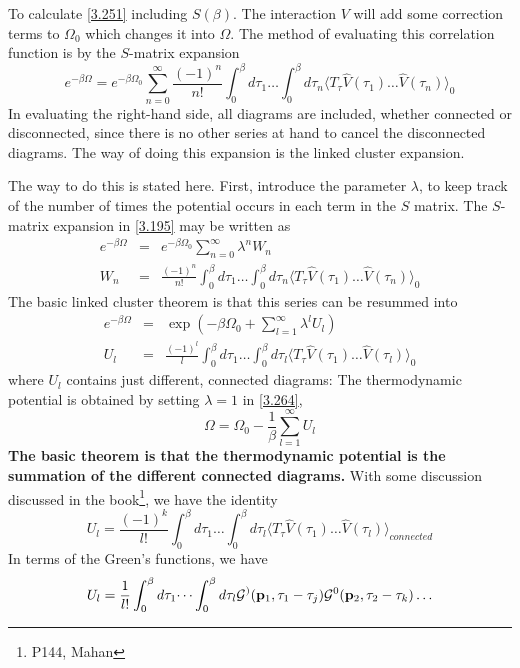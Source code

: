 To calculate \eqref{3.251} including $S(\beta)$.
The interaction $V$ will add some correction terms to $\Omega_0$ which changes it into $\Omega$.
The method of evaluating this correlation function is by the $S$-matrix expansion
\begin{equation}
    e^{-\beta \Omega} = e^{-\beta \Omega_0} \sum_{n=0}^\infty \frac{(-1)^n}{n!} \int_0^\beta d\tau_1 \dots \int_0^\beta d\tau_n \langle T_\tau \hat{V}(\tau_1) \dots \hat{V}(\tau_n) \rangle_0  \label{3.195}
\end{equation}
In evaluating the right-hand side, all diagrams are included, whether connected or disconnected, since there is no other series at hand to cancel the disconnected diagrams.
The way of doing this expansion is the linked cluster expansion.

The way to do this is stated here.
First, introduce the parameter $\lambda$, to keep track of the number of times the potential occurs in each term in the $S$ matrix.
The $S$-matrix expansion in \eqref{3.195} may be written as
\begin{eqnarray}
    e^{-\beta \Omega} &=& e^{-\beta \Omega_0} \sum_{n=0}^\infty \lambda^n W_n   \label{3.262} \\
    W_n &=& \frac{(-1)^n}{n!} \int_0^\beta d\tau_1 \dots \int_0^\beta d\tau_n \langle T_\tau \hat{V}(\tau_1) \dots \hat{V}(\tau_n) \rangle_0    \label{3.263}
\end{eqnarray}
The basic linked cluster theorem is that this series can be resummed into
\begin{eqnarray}
    e^{-\beta \Omega} &=& \exp \left( -\beta \Omega_0 + \sum_{l=1}^\infty \lambda^l U_l \right) \label{3.264} \\
    U_l &=& \frac{(-1)^l}{l} \int_0^\beta d\tau_1 \dots \int_0^\beta d\tau_l \langle T_\tau \hat{V}(\tau_1) \dots \hat{V}(\tau_l) \rangle_0 \label{3.265}
\end{eqnarray}
where $U_l$ contains just different, connected diagrams: The thermodynamic potential is obtained by setting $\lambda=1$ in \eqref{3.264},
\begin{equation}
    \Omega = \Omega_0 - \frac{1}{\beta} \sum_{l=1}^\infty U_l  \label{3.266}
\end{equation}
\textbf{The basic theorem is that the thermodynamic potential is the summation of the different connected diagrams.}
With some discussion discussed in the book\footnote{P144, Mahan}, we have the identity
\begin{equation}
    U_l = \frac{(-1)^k}{l!} \int_0^\beta d \tau_1 \dots \int_0^\beta d \tau_l \langle T_\tau \hat{V}(\tau_1) \dots \hat{V}(\tau_l) \rangle_{connected}  \label{3.274}
\end{equation}
In terms of the Green's functions, we have
\begin{equation}
    U_l = \frac{1}{l!} \int_0^\beta d \tau_1 \dots \int_0^\beta d \tau_l \cg^)(\bp_1, \tau_1 - \tau_j) \cg^0(\bp_2, \tau_2 - \tau_k) \dots  \label{3.275}
\end{equation}

